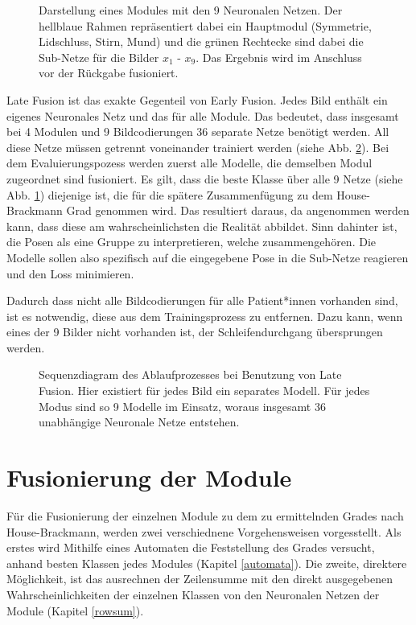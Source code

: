 \begin{figure}[b]
\begin{tikzpicture}[->,>=stealth',shorten >=1pt,auto,node distance=2.5cm,semithick]
\end{tikzpicture}
\caption[Darstellung eines Modules mit den 9 Neuronalen Netzen]{Darstellung eines Modules mit den 9 Neuronalen Netzen. Der hellblaue Rahmen repräsentiert dabei ein Hauptmodul (Symmetrie, Lidschluss, Stirn, Mund) und die grünen Rechtecke sind dabei die Sub-Netze für die Bilder $x_1$ - $x_9$. Das Ergebnis wird im Anschluss vor der Rückgabe fusioniert.}\label{cap:mod_lf}
\end{figure}\label{fig:mod_lf}


Late Fusion ist das exakte Gegenteil von Early Fusion. Jedes Bild enthält ein eigenes Neuronales Netz und das für alle Module. Das bedeutet, dass insgesamt bei 4 Modulen und 9 Bildcodierungen 36 separate Netze benötigt werden. All diese Netze müssen getrennt voneinander trainiert werden (siehe Abb. \ref{cap:late}). Bei dem Evaluierungspozess werden zuerst alle Modelle, die demselben Modul zugeordnet sind fusioniert. Es gilt, dass die beste Klasse über alle 9 Netze (siehe Abb. \ref{cap:mod_lf}) diejenige ist, die für die spätere Zusammenfügung zu dem House-Brackmann Grad genommen wird. Das resultiert daraus, da angenommen werden kann, dass diese am wahrscheinlichsten die Realität abbildet. Sinn dahinter ist, die Posen als eine Gruppe zu interpretieren, welche zusammengehören. Die Modelle sollen also spezifisch auf die eingegebene Pose in die Sub-Netze reagieren und den Loss minimieren.

Dadurch dass nicht alle Bildcodierungen für alle Patient*innen vorhanden sind, ist es notwendig, diese aus dem Trainingsprozess zu entfernen. Dazu kann, wenn eines der 9 Bilder nicht vorhanden ist, der Schleifendurchgang übersprungen werden.



\begin{figure}[!t]\centering
\makebox[0pt]{}
\caption[Sequenzdiagram des Ablaufprozesses bei Benutzung von Late Fusion]{Sequenzdiagram des Ablaufprozesses bei Benutzung von Late Fusion. Hier existiert für jedes Bild ein separates Modell. Für jedes Modus sind so 9 Modelle im Einsatz, woraus insgesamt 36 unabhängige Neuronale Netze entstehen.}\label{cap:late}
\end{figure}\label{fig:late}





\clearpage
\section{Fusionierung der Module}\label{fusion}
Für die Fusionierung der einzelnen Module zu dem zu ermittelnden Grades nach House-Brackmann, werden zwei verschiednene Vorgehensweisen vorgesstellt. Als erstes wird Mithilfe eines Automaten die Feststellung des Grades versucht, anhand besten Klassen jedes Modules (Kapitel \ref{automata}). Die zweite, direktere Möglichkeit, ist das ausrechnen der Zeilensumme mit den direkt ausgegebenen Wahrscheinlichkeiten der einzelnen Klassen von den Neuronalen Netzen der Module (Kapitel \ref{rowsum}).

